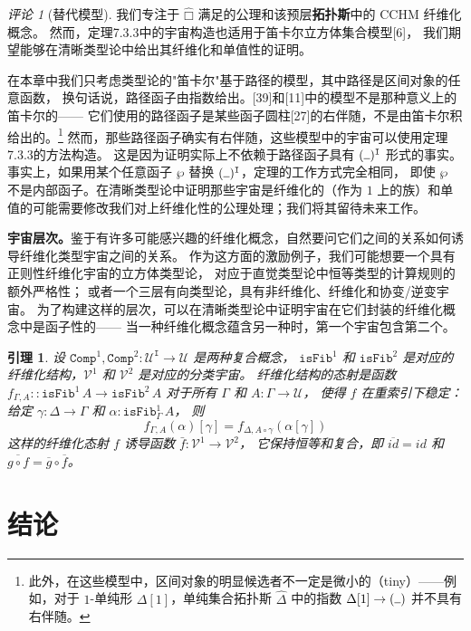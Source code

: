 \documentclass{ctexrep}
\theoremstyle{plain}
\newtheorem{lemma}[theorem]{引理}
\theoremstyle{definition}
\theoremstyle{remark}
\newtheorem{remark}[theorem]{评论}
\newcommand\ttI{\mathtt{I}}
\newcommand\hatcube{\widehat{□}}
\newcommand{\ul}{{\rule[0ex]{0.5em}{0.4pt}}} %
\begin{document}
\begin{remark}[替代模型]
我们专注于 $\hatcube$ 满足的公理和该预层\textbf{拓扑斯}中的 CCHM 纤维化概念。
然而，定理7.3.3中的宇宙构造也适用于笛卡尔立方体集合模型[6]，
我们期望能够在清晰类型论中给出其纤维化和单值性的证明。

在本章中我们只考虑类型论的"笛卡尔"基于路径的模型，其中路径是区间对象的任意函数，
换句话说，路径函子由指数给出。[39]和[11]中的模型不是那种意义上的笛卡尔的——
它们使用的路径函子是某些函子圆柱[27]的右伴随，不是由笛卡尔积给出的。\footnote{此外，在这些模型中，区间对象的明显候选者不一定是微小的（tiny）——例如，对于 $1$-单纯形 $\Delta[1]$，单纯集合拓扑斯 $\widehat{\Delta}$ 中的指数 $\Delta[1] \to (\ul)$ 并不具有右伴随。}
然而，那些路径函子确实有右伴随，这些模型中的宇宙可以使用定理7.3.3的方法构造。
这是因为证明实际上不依赖于路径函子具有 $(\ul)^\ttI$ 形式的事实。
事实上，如果用某个任意函子 $\wp$ 替换 $(\ul)^\ttI$，定理的工作方式完全相同，
即使 $\wp$ 不是内部函子。在清晰类型论中证明那些宇宙是纤维化的（作为 $1$ 上的族）和单值的可能需要修改我们对上纤维化性的公理处理；我们将其留待未来工作。
\end{remark}

\textbf{宇宙层次。}鉴于有许多可能感兴趣的纤维化概念，自然要问它们之间的关系如何诱导纤维化类型宇宙之间的关系。
作为这方面的激励例子，我们可能想要一个具有正则性纤维化宇宙的立方体类型论，
对应于直觉类型论中恒等类型的计算规则的额外严格性；
或者一个三层有向类型论，具有非纤维化、纤维化和协变/逆变宇宙。
为了构建这样的层次，可以在清晰类型论中证明宇宙在它们封装的纤维化概念中是函子性的——
当一种纤维化概念蕴含另一种时，第一个宇宙包含第二个。

\begin{lemma}
设 $\mathtt{Comp}^1, \mathtt{Comp}^2 : \mathcal{U}^\ttI \to \mathcal{U}$ 是两种复合概念，
$\mathtt{isFib}^1$ 和 $\mathtt{isFib}^2$ 是对应的纤维化结构，$\mathcal{V}^1$ 和 $\mathcal{V}^2$ 是对应的分类宇宙。
纤维化结构的态射是函数 $f_{\Gamma,A} :: \mathtt{isFib}^1\,A \to \mathtt{isFib}^2\,A$ 对于所有 $\Gamma$ 和 $A : \Gamma \to \mathcal{U}$，
使得 $f$ 在重索引下稳定：给定 $\gamma : \Delta \to \Gamma$ 和 $\alpha : \mathtt{isFib}^1_\Gamma\,A$，
则 \[f_{\Gamma,A}(\alpha)[\gamma] = f_{\Delta,A \circ \gamma}(\alpha[\gamma])\]
这样的纤维化态射 $f$ 诱导函数 $\bar{f} : \mathcal{V}^1 \to \mathcal{V}^2$，
它保持恒等和复合，即 $\overline{id} = id$ 和 $\overline{g \circ f} = \overline{g} \circ \overline{f}$。
\end{lemma}

\section{结论}
\end{document}
